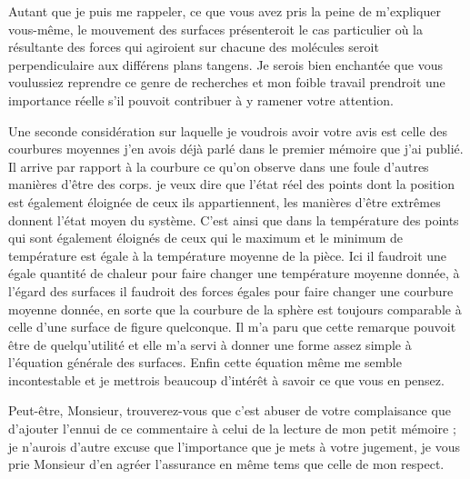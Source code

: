 \documentclass[11pt,a4paper]{article}
\begin{document}
Autant que je puis me rappeler, ce que vous avez pris la peine de m'expliquer
vous-même, le mouvement des surfaces présenteroit le cas particulier où la
résultante des forces qui agiroient sur chacune des molécules seroit
perpendiculaire aux différens plans tangens.
Je serois bien enchantée que vous voulussiez reprendre ce genre de recherches
et mon foible travail prendroit  une importance réelle
s'il pouvoit contribuer à y ramener votre attention.

Une seconde considération sur laquelle je voudrois avoir votre avis est celle
des courbures moyennes j'en avois déjà parlé dans le premier mémoire que j'ai
publié. Il arrive par rapport à la courbure ce qu'on observe dans une foule
d'autres manières d'être des corps. je veux dire que l'état réel des points
dont la position est également éloignée de ceux \struck{\ill{}}
 ils appartiennent, les manières d'être extrêmes donnent
l'état moyen du système. C'est ainsi que dans  la
température des points qui sont également éloignés de ceux qui
 le maximum et le minimum de température
  est égale à la température moyenne
de la pièce. Ici il faudroit une égale quantité de chaleur pour faire changer
une température moyenne donnée, à l'égard des surfaces il faudroit des forces
égales pour faire changer une courbure moyenne donnée, en sorte que la
courbure de la sphère est toujours comparable à celle d'une surface de figure
quelconque. Il m'a paru que cette remarque pouvoit être de quelqu'utilité et
elle m'a servi à donner une forme assez simple à l'équation générale des
surfaces. Enfin cette équation même me semble incontestable et je mettrois
beaucoup d'intérêt à savoir ce que vous en pensez.

Peut-être, Monsieur, trouverez-vous que c'est abuser de votre complaisance
que  d'ajouter l'ennui de ce commentaire à celui de la
lecture de mon petit mémoire ; je n'aurois d'autre excuse que l'importance que
je mets à votre jugement, je vous prie Monsieur d'en agréer l'assurance en
même tems que celle de mon respect.
\end{document}
